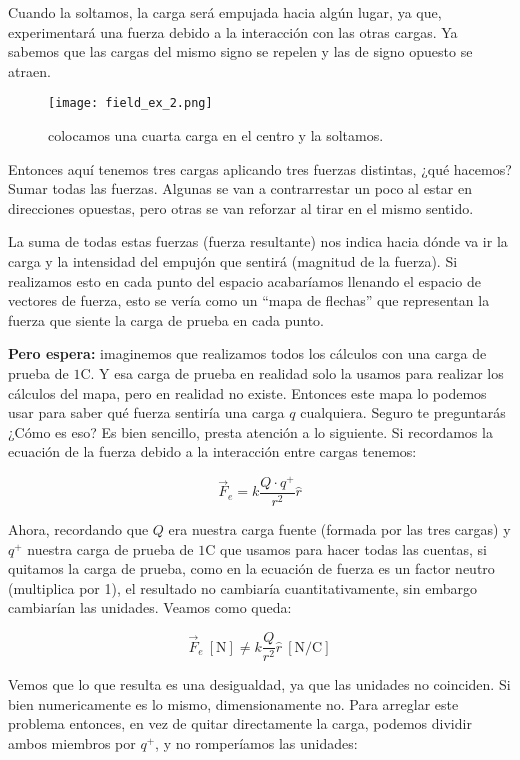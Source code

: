 Cuando la soltamos, la carga será empujada hacia algún lugar, ya que, experimentará una fuerza debido a la interacción con las otras cargas. Ya sabemos que las cargas del mismo signo se repelen y las de signo opuesto se atraen.

\begin{figure}[ht]
    \centering
    \texttt{[image: field\_ex\_2.png]}
    \caption{colocamos una cuarta carga en el centro y la soltamos.}
    \label{fig:campo_electrico_ejemplo_2}
\end{figure}

Entonces aquí tenemos tres cargas aplicando tres fuerzas distintas, ¿qué hacemos? Sumar todas las fuerzas. Algunas se van a contrarrestar un poco al estar en direcciones opuestas, pero otras se van reforzar al tirar en el mismo sentido.

La suma de todas estas fuerzas (fuerza resultante) nos indica hacia dónde va ir la carga y la intensidad del empujón que sentirá (magnitud de la fuerza). Si realizamos esto en cada punto del espacio acabaríamos llenando el espacio de vectores de fuerza, esto se vería como un ``mapa de flechas'' que representan la fuerza que siente la carga de prueba en cada punto.

\textbf{Pero espera:} imaginemos que realizamos todos los cálculos con una carga de prueba de \( 1 \si{\coulomb} \). Y esa carga de prueba en realidad solo la usamos para realizar los cálculos del mapa, pero en realidad no existe. Entonces este mapa lo podemos usar para saber qué fuerza sentiría una carga \( q \) cualquiera.
Seguro te preguntarás ¿Cómo es eso? Es bien sencillo, presta atención a lo siguiente. Si recordamos la ecuación de la fuerza debido a la interacción entre cargas tenemos:

\[
\vec{F}_e = k\frac{Q\cdot q^{+}}{r^2}\hat{r} 
\]

Ahora, recordando que \( Q \) era nuestra carga fuente (formada por las tres cargas) y \( q^{+} \) nuestra carga de prueba de \( 1 \si{\coulomb} \) que usamos para hacer todas las cuentas, si quitamos la carga de prueba, como en la ecuación de fuerza es un factor neutro (multiplica por 1), el resultado no cambiaría cuantitativamente, sin embargo cambiarían las unidades. Veamos como queda:

\[
\vec{F}_e ~ [\si{\newton}] \neq k \frac{Q}{r^2} \hat{r} ~ [\si{\newton\per\coulomb}]
\]

Vemos que lo que resulta es una desigualdad, ya que las unidades no coinciden. Si bien numericamente es lo mismo, dimensionamente no. Para arreglar este problema entonces, en vez de quitar directamente la carga, podemos dividir ambos miembros por \( q^{+} \), y no romperíamos las unidades:

